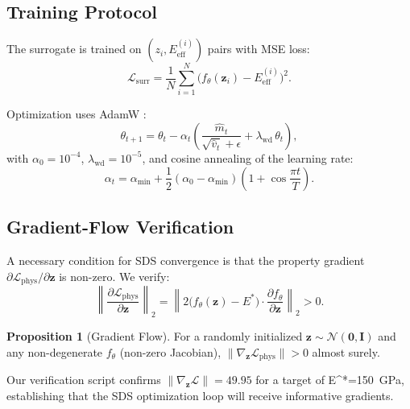 \documentclass[12pt,a4paper]{article}
\newcommand{\N}{\mathcal{N}}
\newcommand{\loss}{\mathcal{L}}
\newcommand{\Eeff}{E_{\mathrm{eff}}}
\newcommand{\Etar}{E^{*}}
\newcommand{\zvec}{\bm{z}}
\theoremstyle{definition}
\newtheorem{proposition}{Proposition}
\begin{document}
\subsection{Training Protocol}

The surrogate is trained on $(z_i, \Eeff^{(i)})$ pairs with MSE loss:
\begin{equation}
  \loss_{\mathrm{surr}} = \frac{1}{N} \sum_{i=1}^{N} \bigl( f_\theta(\zvec_i) - \Eeff^{(i)} \bigr)^2.
  \label{eq:surrogate_loss}
\end{equation}

Optimization uses AdamW \cite{loshchilov2019decoupled}:
\begin{equation}
  \theta_{t+1} = \theta_t - \alpha_t \left(
    \frac{\hat{m}_t}{\sqrt{\hat{v}_t} + \epsilon} + \lambda_{\mathrm{wd}}\, \theta_t
  \right),
\end{equation}
with $\alpha_0 = 10^{-4}$, $\lambda_{\mathrm{wd}} = 10^{-5}$, and cosine
annealing of the learning rate:
\begin{equation}
  \alpha_t = \alpha_{\min} + \frac{1}{2}(\alpha_0 - \alpha_{\min})
    \left(1 + \cos\frac{\pi t}{T}\right).
  \label{eq:cosine_lr}
\end{equation}

\subsection{Gradient-Flow Verification}

A necessary condition for SDS convergence is that the property gradient
$\partial \loss_{\mathrm{phys}} / \partial \zvec$ is non-zero.  We verify:
\begin{equation}
  \left\| \frac{\partial \loss_{\mathrm{phys}}}{\partial \zvec} \right\|_2
  = \left\| 2\bigl(f_\theta(\zvec) - \Etar\bigr) \cdot \frac{\partial f_\theta}{\partial \zvec} \right\|_2 > 0.
  \label{eq:grad_flow}
\end{equation}

\begin{proposition}[Gradient Flow]
For a randomly initialized $\zvec \sim \N(\bm{0}, \bm{I})$ and any
non-degenerate $f_\theta$ (non-zero Jacobian), $\| \nabla_\zvec \loss_{\mathrm{phys}} \| > 0$
almost surely.
\end{proposition}

Our verification script confirms $\| \nabla_\zvec \loss \| = 49.95$ for a
target of \Etar=150~GPa, establishing that the SDS optimization loop will
receive informative gradients.
\end{document}
